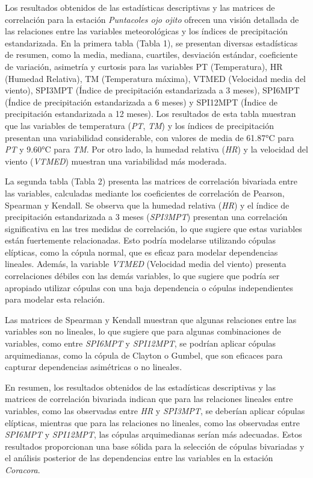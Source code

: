 \begin{figure}[htbp]
\end{figure}




Los resultados obtenidos de las estadísticas descriptivas y las matrices de correlación para la estación \textit{Puntacoles ojo ojito } ofrecen una visión detallada de las relaciones entre las variables meteorológicas y los índices de precipitación estandarizada. En la primera tabla (Tabla 1), se presentan diversas estadísticas de resumen, como la media, mediana, cuartiles, desviación estándar, coeficiente de variación, asimetría y curtosis para las variables PT (Temperatura), HR (Humedad Relativa), TM (Temperatura máxima), VTMED (Velocidad media del viento), SPI3MPT (Índice de precipitación estandarizada a 3 meses), SPI6MPT (Índice de precipitación estandarizada a 6 meses) y SPI12MPT (Índice de precipitación estandarizada a 12 meses). Los resultados de esta tabla muestran que las variables de temperatura (\textit{PT}, \textit{TM}) y los índices de precipitación presentan una variabilidad considerable, con valores de media de 61.87°C para \textit{PT} y 9.60°C para \textit{TM}. Por otro lado, la humedad relativa (\textit{HR}) y la velocidad del viento (\textit{VTMED}) muestran una variabilidad más moderada.

La segunda tabla (Tabla 2) presenta las matrices de correlación bivariada entre las variables, calculadas mediante los coeficientes de correlación de Pearson, Spearman y Kendall. Se observa que la humedad relativa (\textit{HR}) y el índice de precipitación estandarizada a 3 meses (\textit{SPI3MPT}) presentan una correlación significativa en las tres medidas de correlación, lo que sugiere que estas variables están fuertemente relacionadas. Esto podría modelarse utilizando cópulas elípticas, como la cópula normal, que es eficaz para modelar dependencias lineales. Además, la variable \textit{VTMED} (Velocidad media del viento) presenta correlaciones débiles con las demás variables, lo que sugiere que podría ser apropiado utilizar cópulas con una baja dependencia o cópulas independientes para modelar esta relación.

Las matrices de Spearman y Kendall muestran que algunas relaciones entre las variables son no lineales, lo que sugiere que para algunas combinaciones de variables, como entre \textit{SPI6MPT} y \textit{SPI12MPT}, se podrían aplicar cópulas arquimedianas, como la cópula de Clayton o Gumbel, que son eficaces para capturar dependencias asimétricas o no lineales.

En resumen, los resultados obtenidos de las estadísticas descriptivas y las matrices de correlación bivariada indican que para las relaciones lineales entre variables, como las observadas entre \textit{HR} y \textit{SPI3MPT}, se deberían aplicar cópulas elípticas, mientras que para las relaciones no lineales, como las observadas entre \textit{SPI6MPT} y \textit{SPI12MPT}, las cópulas arquimedianas serían más adecuadas. Estos resultados proporcionan una base sólida para la selección de cópulas bivariadas y el análisis posterior de las dependencias entre las variables en la estación \textit{Coracora}.



